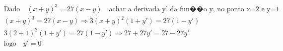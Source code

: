 \begin{ex}
\begin{align}
&\text{Dado}\quad (x+y)^3=27(x-y)\quad \text{achar a derivada y' da fun��o y, no ponto x=2 e y=1}\nonumber\\
&(x+y)^3=27(x-y) \Rightarrow 3(x+y)^2(1+y') = 27(1-y')\nonumber\\
&3(2+1)^2(1+y')=27(1-y') \Rightarrow 27+27y'=27-27y'\nonumber\\
&\text{logo} \quad y'=0\nonumber
\end{align}
\end{ex}